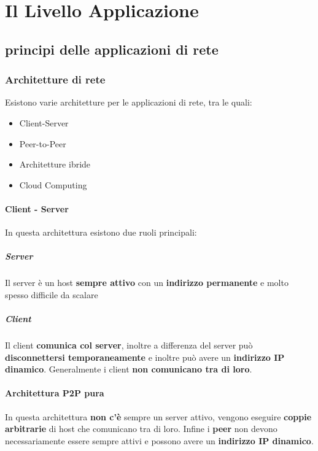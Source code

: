\chapter{Il Livello Applicazione}
\thispagestyle{chapterInit}
\section{principi delle applicazioni di rete}
    \subsection{Architetture di rete}
        Esistono varie architetture per le applicazioni di rete, tra le quali:
        \begin{itemize}
            \item Client-Server
            \item Peer-to-Peer
            \item Architetture ibride
            \item Cloud Computing 
        \end{itemize}
        \subsubsection{Client - Server}
        \label{subsubsec:clientServer}
            In questa architettura esistono due ruoli principali:
            \paragraph{Server} Il server è un host \textbf{sempre attivo} con un \textbf{indirizzo permanente} e molto spesso difficile da scalare
            \paragraph{Client} Il client \textbf{comunica col server}, inoltre a differenza del server può \textbf{disconnettersi temporaneamente} e inoltre può avere un \textbf{indirizzo IP dinamico}. Generalmente i client \textbf{non comunicano tra di loro}.
        \subsubsection{Architettura P2P pura}
            In questa architettura \textbf{non c'è} sempre un server attivo, vengono eseguire \textbf{coppie arbitrarie} di host che comunicano tra di loro. Infine i \textbf{peer} non devono necessariamente essere sempre attivi e possono avere un \textbf{indirizzo IP dinamico}.

